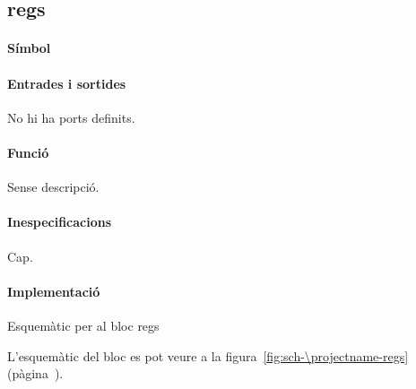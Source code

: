 \subsection{\label{sub:\projectname-regs} \textsf{regs}}

\paragraph{Símbol}

\begin{center}  \end{center}

\paragraph{Entrades i sortides}

No hi ha ports definits.

\paragraph{Funció}

Sense descripció.

\paragraph{Inespecificacions}

Cap.

\paragraph{Implementació}

\begin{contendfig}
  \begin{center}
  \end{center}
  \caption{\label{fig:sch-\projectname-regs} Esquemàtic per al bloc \textsf{regs}}
\end{contendfig}

L'esquemàtic del bloc es pot veure a la figura~\ref{fig:sch-\projectname-regs} (pàgina~\pageref{fig:sch-\projectname-regs}).


\vspace{1cm}
